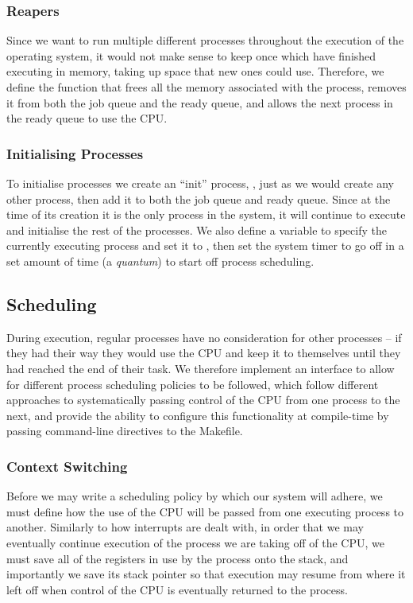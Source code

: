     \subsubsection{Reapers}
        \label{sec:cleanup}
        Since we want to run multiple different processes throughout the
        execution of the operating system, it would not make sense to keep once
        which have finished executing in memory, taking up space that new ones
        could use. Therefore, we define the  function that frees
        all the memory associated with the process, removes it from both the job
        queue and the ready queue, and allows the next process in the ready
        queue to use the CPU.

    \subsubsection{Initialising Processes}
        To initialise processes we create an ``init'' process, , just
        as we would create any other process, then add it to both the job queue
        and ready queue. Since at the time of its creation it is the only
        process in the system, it will continue to execute and initialise the
        rest of the processes. We also define a variable to specify the
        currently executing process and set it to , then set the
        system timer to go off in a set amount of time (a \textit{quantum}) to
        start off process scheduling.

\subsection{Scheduling}
    During execution, regular processes have no consideration for other
    processes -- if they had their way they would use the CPU and keep it to
    themselves until they had reached the end of their task. We therefore
    implement an interface to allow for different process scheduling policies to
    be followed, which follow different approaches to systematically passing
    control of the CPU from one process to the next, and provide the ability to
    configure this functionality at compile-time by passing command-line
    directives to the Makefile.

    \subsubsection{Context Switching}
        Before we may write a scheduling policy by which our system will adhere,
        we must define how the use of the CPU will be passed from one executing
        process to another. Similarly to how interrupts are dealt with, in
        order that we may eventually continue execution of the process we are
        taking off of the CPU, we must save all of the registers in use by the
        process onto the stack, and importantly we save its stack pointer so
        that execution may resume from where it left off when control of the CPU
        is eventually returned to the process.

